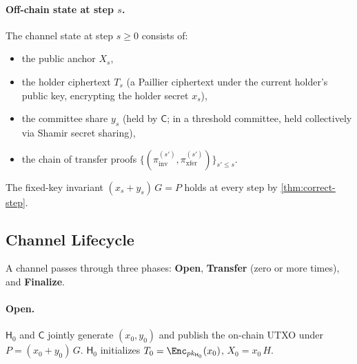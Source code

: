 \paragraph{Off-chain state at step $s$.} The channel state at step $s \geq 0$ consists of:
\begin{itemize}
  \item the public anchor $X_s$,
  \item the holder ciphertext $T_s$ (a Paillier ciphertext under the current holder's public key, encrypting the holder secret $x_s$),
  \item the committee share $y_s$ (held by $\mathsf{C}$; in a threshold committee, held collectively via Shamir secret sharing),
  \item the chain of transfer proofs $\{(\pi^{(s')}_{\mathrm{inv}}, \pi^{(s')}_{\mathrm{xfer}})\}_{s' \leq s}$.
\end{itemize}

The fixed-key invariant $(x_s + y_s)\,G = P$ holds at every step by \autoref{thm:correct-step}.

\subsection{Channel Lifecycle}\label{sec:lifecycle}

A \thunderbolt channel passes through three phases: \textbf{Open}, \textbf{Transfer} (zero or more times), and \textbf{Finalize}.

\paragraph{Open.} $\mathsf{H}_0$ and $\mathsf{C}$ jointly generate $(x_0, y_0)$ and publish the on-chain UTXO under $P = (x_0 + y_0)\,G$. $\mathsf{H}_0$ initializes $T_0 = \Enc_{pk_{\mathsf{H}_0}}(x_0)$, $X_0 = x_0\,H$.

